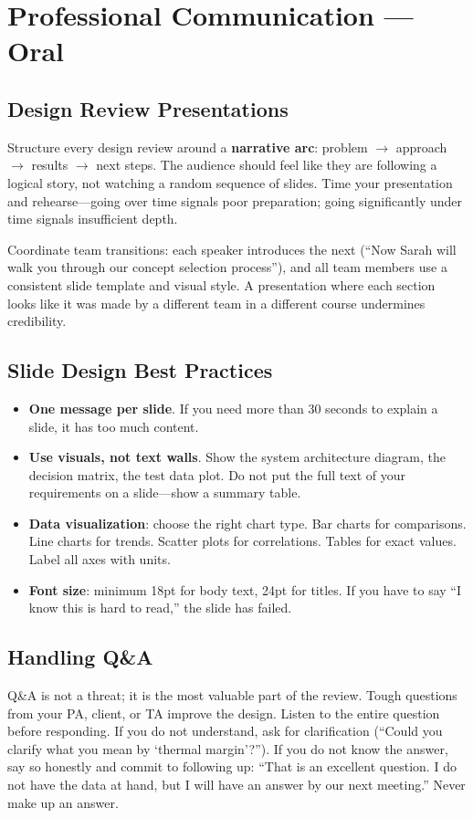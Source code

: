 \chapter{Professional Communication --- Oral}

\section{Design Review Presentations}
Structure every design review around a \textbf{narrative arc}: problem $\to$ approach $\to$ results $\to$ next steps. The audience should feel like they are following a logical story, not watching a random sequence of slides. Time your presentation and rehearse---going over time signals poor preparation; going significantly under time signals insufficient depth.

Coordinate team transitions: each speaker introduces the next (``Now Sarah will walk you through our concept selection process''), and all team members use a consistent slide template and visual style. A presentation where each section looks like it was made by a different team in a different course undermines credibility.

\section{Slide Design Best Practices}
\begin{itemize}[nosep,leftmargin=1.5em]
\item \textbf{One message per slide}. If you need more than 30 seconds to explain a slide, it has too much content.
\item \textbf{Use visuals, not text walls}. Show the system architecture diagram, the decision matrix, the test data plot. Do not put the full text of your requirements on a slide---show a summary table.
\item \textbf{Data visualization}: choose the right chart type. Bar charts for comparisons. Line charts for trends. Scatter plots for correlations. Tables for exact values. Label all axes with units.
\item \textbf{Font size}: minimum 18pt for body text, 24pt for titles. If you have to say ``I know this is hard to read,'' the slide has failed.
\end{itemize}

\section{Handling Q\&A}
Q\&A is not a threat; it is the most valuable part of the review. Tough questions from your PA, client, or TA improve the design. Listen to the entire question before responding. If you do not understand, ask for clarification (``Could you clarify what you mean by `thermal margin'?''). If you do not know the answer, say so honestly and commit to following up: ``That is an excellent question. I do not have the data at hand, but I will have an answer by our next meeting.'' Never make up an answer.

